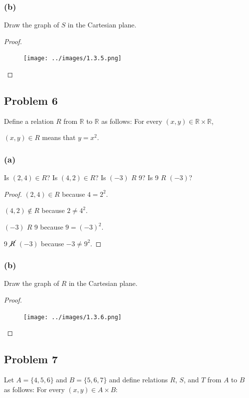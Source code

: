 \documentclass[14pt]{extarticle}
\newcommand{\R}{\mathbb{R}}
\begin{document}
\subsubsection{(b)}
Draw the graph of $S$ in the Cartesian plane.

\begin{proof}
    \begin{figure}[ht!]
        \centering
        \texttt{[image: ../images/1.3.5.png]}
    \end{figure}
\end{proof}

\subsection{Problem 6}
Define a relation $R$ from $\R$ to $\R$ as follows:
For every $(x, y) \in \R \times \R$,

\begin{center}
    $(x, y) \in R$ means that $y = x^2$.
\end{center}

\subsubsection{(a)}
Is $(2, 4) \in R$? Is $(4, 2) \in R$? Is $(-3)$ $R$ 9? Is 9 $R$ $(-3)$?

\begin{proof}
    $(2, 4) \in R$ because $4 = 2^2$.

    $(4, 2) \notin R$ because $2 \neq 4^2$.

    $(-3)$ $R$ 9 because $9 = (-3)^2$.

    9 $\cancel{R}$ $(-3)$ because $-3 \neq 9^2$.
\end{proof}

\subsubsection{(b)}
Draw the graph of $R$ in the Cartesian plane.

\begin{proof}
    \begin{figure}[ht!]
        \centering
        \texttt{[image: ../images/1.3.6.png]}
    \end{figure}
\end{proof}

\subsection{Problem 7}
Let $A = \{4, 5, 6\}$ and $B = \{5, 6, 7\}$ and define relations $R$, $S$, and
$T$ from $A$ to $B$ as follows: For every $(x, y) \in A \times B$:
\end{document}
